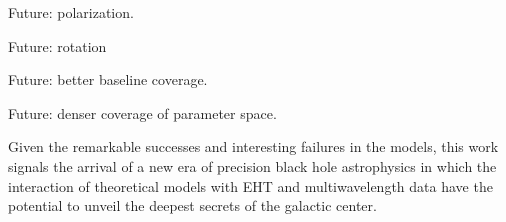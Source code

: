 Future: polarization.

Future: rotation

Future: better baseline coverage. 

Future: denser coverage of parameter space.  

Given the remarkable successes and interesting failures in the models, this work signals the arrival of a new era of precision black hole astrophysics in which the interaction of  theoretical models with EHT and multiwavelength data have the potential to unveil the deepest secrets of the galactic center.  



